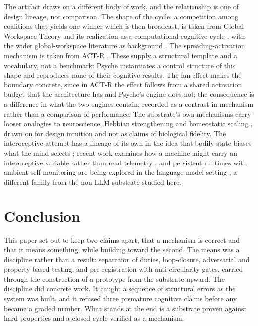 \documentclass[conference]{IEEEtran}
\begin{document}
The artifact draws on a different body of work, and the relationship is one of design lineage,
not comparison. The shape of the cycle, a competition among coalitions that yields one winner
which is then broadcast, is taken from Global Workspace Theory \cite{baars1988cognitive} and its
realization as a computational cognitive cycle \cite{franklin2014lida}, with the wider
global-workspace literature as background \cite{dehaene2011experimental, shanahan2006combines,
shanahan2010embodiment}. The spreading-activation mechanism is taken from ACT-R
\cite{anderson1998atomic}. These supply a structural template and a vocabulary, not a benchmark:
Psyche instantiates a control structure of this shape and reproduces none of their cognitive
results. The fan effect makes the boundary concrete, since in ACT-R the effect follows from a
shared activation budget \cite{anderson1974retrieval, andersonreder1999fan} that the architecture
has and Psyche's engine does not; the consequence is a difference in what the two engines
contain, recorded as a contrast in mechanism rather than a comparison of performance. The
substrate's own mechanisms carry looser analogies to neuroscience, Hebbian strengthening
\cite{hebb1949organization} and homeostatic scaling \cite{turrigiano2008selftuning}, drawn on for
design intuition and not as claims of biological fidelity. The interoceptive attempt has a lineage
of its own in the idea that bodily state biases what the mind selects \cite{damasio1994descartes,
craig2002interoception, easterbrook1959effect}; recent work examines how a machine might carry an
interoceptive variable rather than read telemetry \cite{candiarivera2026interoceptive}, and
persistent runtimes with ambient self-monitoring are being explored in the language-model setting
\cite{brady2026springdrift}, a different family from the non-LLM substrate studied here.

\section{Conclusion}\label{sec:conclusion}
This paper set out to keep two claims apart, that a mechanism is correct and that it means
something, while building toward the second. The means was a discipline rather than a result:
separation of duties, loop-closure, adversarial and property-based testing, and
pre-registration with anti-circularity gates, carried through the construction of a prototype
from the substrate upward. The discipline did concrete work. It caught a sequence of structural
errors as the system was built, and it refused three premature cognitive claims before any
became a graded number. What stands at the end is a substrate proven against hard properties
and a closed cycle verified as a mechanism.
\end{document}

